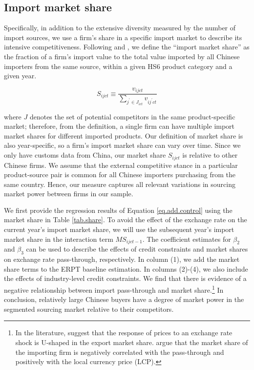 \subsection{Import market share}

Specifically, in addition to the extensive diversity measured by the number of import sources, we use a firm's share in a specific import market to describe its intensive competitiveness. Following \cite{aik2014} and \cite{devereux2017}, we define the ``import market share'' as the fraction of a firm's import value to the total value imported by all Chinese importers from the same source, within a given HS6 product category and a given year. 

$$
S_{ijct} \equiv \frac{v_{ijct}}{\sum_{j^{\prime} \in J_{ict}} v_{ij^{\prime}ct}}
$$

where $J$ denotes the set of potential competitors in the same product-specific market; therefore, from the definition, a single firm can have multiple import market shares for different imported products. Our definition of market share is also year-specific, so a firm’s import market share can vary over time. Since we only have customs data from China, our market share $S_{ijct}$ is relative to other Chinese firms. We assume that the external competitive stance in a particular product-source pair is common for all Chinese importers purchasing from the same country. Hence, our measure captures all relevant variations in sourcing market power between firms in our sample.

We first provide the regression results of Equation \ref{eq.add.control} using the market share in Table \ref{tab.share}. To avoid the effect of the exchange rate on the current year's import market share, we will use the subsequent year's import market share in the interaction term $MS_{ijct-1}$. The coefficient estimates for $\beta_2$ and $\beta_3$ can be used to describe the effects of credit constraints and market shares on exchange rate pass-through, respectively. In column (1), we add the market share terms to the ERPT baseline estimation. In columns (2)-(4), we also include the effects of industry-level credit constraints. We find that there is evidence of a negative relationship between import pass-through and market share.\footnote{In the literature, \cite{auer2016} suggest that the response of prices to an exchange rate shock is U-shaped in the export market share. \cite{devereux2017} argue that the market share of the importing firm is negatively correlated with the pass-through and positively with the local currency price (LCP).} In conclusion, relatively large Chinese buyers have a degree of market power in the segmented sourcing market relative to their competitors.

